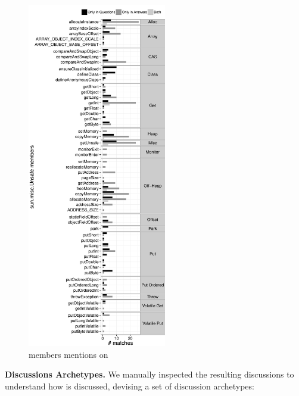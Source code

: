 \begin{figure}[h!]
\centering
\includegraphics[width=0.54\textwidth]{chapters/unsafe/usage-so}
\caption{\smu{} members mentions on \stackoverflow{}}
\label{fig:unsafe:usage-so}
\end{figure}

{ \bfseries Discussions Archetypes. } 
We manually inspected the resulting discussions to understand how \smu{} is discussed, devising a set of discussion archetypes:

